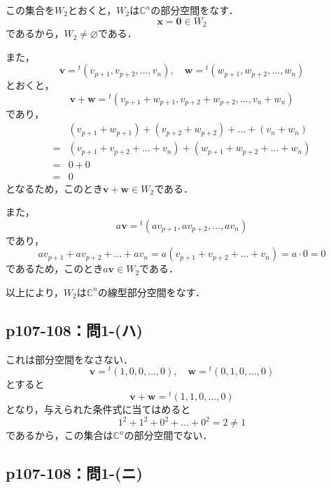 \documentclass[a4paper,10pt,fleqn]{ltjsarticle}
\begin{document}
\begin{tleftbar}
    この集合を$W_2$とおくと，$W_2$は$\mathbb{C}^n$の部分空間をなす．
    \[
        \bm{x} = \bm{0} \in W_2
    \]
    であるから，$W_2 \ne \varnothing$である．

    また，
    \[
        \bm{v} ={}^t (v_{p+1} , v_{p+2} , \ldots , v_{n} ) , \quad \bm{w} ={}^t ( w_{p+1} , w_{p+2} , \ldots , w_{n} )
    \]
    とおくと，
    \[
        \bm{v}+ \bm{w} = {}^t (v_{p+1}+w_{p+1},v_{p+2}+w_{p+2},\ldots,v_n + w_n)
    \]
    であり，
    \begin{align*}
          & ( v_{p+1}+w_{p+1}) +(v_{p+2}+w_{p+2})+ \dots + (v_n+w_n) \\
        = & (v_{p+1}+v_{p+2}+\dots+v_n)+(w_{p+1}+w_{p+2}+\dots+w_n)  \\
        = & 0+0                                                      \\
        = & 0
    \end{align*}
    となるため，このとき$\bm{v}+\bm{w} \in W_2$である．

    また，
    \[
        a\bm{v} = {}^t (av_{p+1},av_{p+2},\ldots,av_n)
    \]
    であり，
    \[
        av_{p+1} + av_{p+2}+\dots + av_n =a (v_{p+1}+v_{p+2}+\dots+v_n) = a\cdot 0 =0
    \]
    であるため，このとき$a \bm{v} \in W_2$である．

    以上により，$W_2$は$\mathbb{C}^n$の線型部分空間をなす．
\end{tleftbar}

\subsection*{p107-108：問1-(ハ)}

\begin{tleftbar}
    これは部分空間をなさない．
    \[
        \bm{v}= {}^t (1,0,0,\ldots , 0),\quad \bm{w}={}^t (0,1,0,\ldots ,0)
    \]
    とすると
    \[
        \bm{v} + \bm{w}={}^t (1,1,0,\ldots,0)
    \]
    となり，与えられた条件式に当てはめると
    \[
        1^2+1^2+0^2 +\dots + 0^2 =2 \ne 1
    \]
    であるから，この集合は$\mathbb{C}^n$の部分空間でない．
\end{tleftbar}


\subsection*{p107-108：問1-(ニ)}
\end{document}
